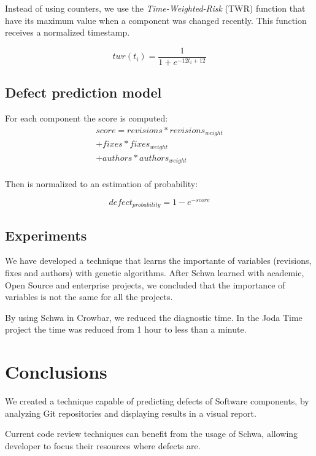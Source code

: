 \documentclass[9pt,a4paper]{extarticle}
\begin{document}
\begin{multicols}{2}
Instead of using counters, we use the \emph{Time-Weighted-Risk} (TWR) function that
have its maximum value when a component was changed recently. This function
receives a normalized timestamp\cite{Chris2013}.

\begin{equation}
twr(t_i) = \frac{1}{1 + e^{-12t_i + 12 }}
\end{equation}

\subsection{Defect prediction model}
For each component the score is computed:
\begin{equation}
\begin{multlined}score = revisions * revisions_{weight} \\
+ fixes * fixes_{weight} \\
+ authors * authors_{weight} \\
\end{multlined}
\end{equation}

Then is normalized to an estimation of probability:

\begin{equation}
defect_{probability} = 1 - e^{-score}
\end{equation}

\subsection{Experiments}
We have developed a technique that learns the importante of variables (revisions,
fixes and authors) with genetic algorithms. After Schwa learned with academic,
Open Source and enterprise projects, we concluded that the importance of variables
is not the same for all the projects.

By using Schwa in Crowbar, we reduced the diagnostic time. In the Joda Time project
the time was reduced from 1 hour to less than a minute.

\section{Conclusions}\label{sec:conclui}
We created a technique capable of predicting defects of Software components, by
analyzing Git repositories and displaying results in a visual report.

Current code review techniques can benefit from the usage of Schwa, allowing
developer to focus their resources where defects are.



\end{multicols}
\end{document}
